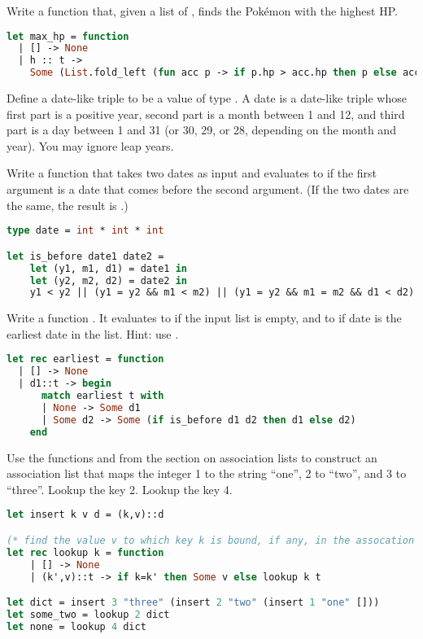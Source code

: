 \problem[pokefun]
Write a function  that, given a list of , finds the Pokémon with the highest HP.

\begin{lstlisting}[language=OCaml]
let max_hp = function
  | [] -> None
  | h :: t ->
    Some (List.fold_left (fun acc p -> if p.hp > acc.hp then p else acc) h t)
\end{lstlisting}

Define a date-like triple to be a value of type . A date is a date-like triple whose first part is a positive year, second part is a month between 1 and 12, and third part is a day between 1 and 31 (or 30, 29, or 28, depending on the month and year). You may ignore leap years.

Write a function  that takes two dates as input and evaluates to  if the first argument is a date that comes before the second argument. (If the two dates are the same, the result is .)

\begin{lstlisting}[language=OCaml]
type date = int * int * int

let is_before date1 date2 =
	let (y1, m1, d1) = date1 in
	let (y2, m2, d2) = date2 in
	y1 < y2 || (y1 = y2 && m1 < m2) || (y1 = y2 && m1 = m2 && d1 < d2)
\end{lstlisting}

Write a function . It evaluates to  if the input list is empty, and to  if date  is the earliest date in the list. Hint: use .

\begin{lstlisting}[language=OCaml]
let rec earliest = function
  | [] -> None
  | d1::t -> begin
      match earliest t with
      | None -> Some d1
      | Some d2 -> Some (if is_before d1 d2 then d1 else d2)
    end
\end{lstlisting}

Use the functions  and  from the section on association lists to construct an association list that maps the integer 1 to the string ``one'', 2 to ``two'', and 3 to ``three''. Lookup the key 2. Lookup the key 4.

\begin{lstlisting}[language=OCaml]
let insert k v d = (k,v)::d

(* find the value v to which key k is bound, if any, in the assocation list *)
let rec lookup k = function
	| [] -> None
	| (k',v)::t -> if k=k' then Some v else lookup k t

let dict = insert 3 "three" (insert 2 "two" (insert 1 "one" []))
let some_two = lookup 2 dict
let none = lookup 4 dict
\end{lstlisting}

